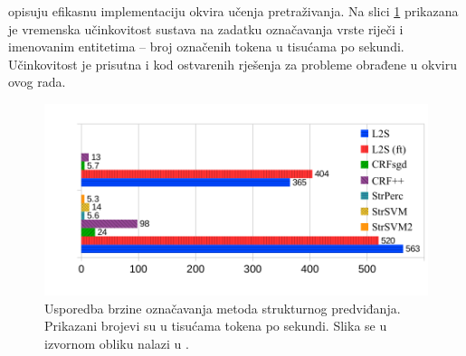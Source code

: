 \citet{daume14lts} opisuju efikasnu implementaciju okvira učenja pretraživanja.
Na slici \ref{fig:ltsperf} prikazana je vremenska učinkovitost sustava na
zadatku označavanja vrste riječi i imenovanim entitetima -- broj označenih
tokena u tisućama po sekundi. Učinkovitost je prisutna i kod ostvarenih rješenja
za probleme obrađene u okviru ovog rada.

\begin{figure}
  \centering
  \includegraphics[scale=0.9]{tokenposec.pdf}
  \caption[Usporedba brzine označavanja metoda strukturnog
  predviđanja.]{Usporedba brzine označavanja metoda strukturnog predviđanja.
  Prikazani brojevi su u tisućama tokena po sekundi. Slika se u izvornom obliku
  nalazi u \citep{ltsicmltutorial}.}
  \label{fig:ltsperf}
\end{figure}
